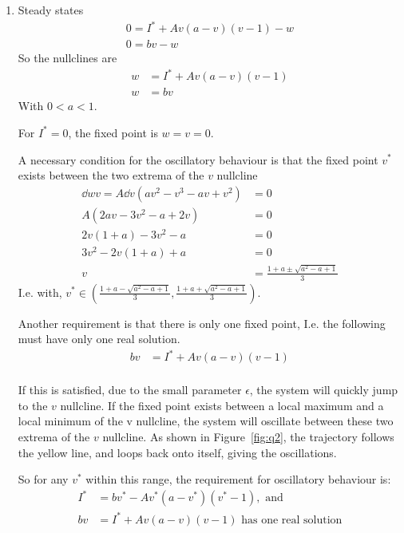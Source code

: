 \documentclass{X:/Documents/Coding/Latex/myassignment}
\begin{document}
\begin{enumerate}
\begin{enumerate}
	\end{enumerate}
	\item
	Steady states
	\begin{align*}
		0 =I^* + A v (a- v)(v -1) - w\\
		0 = bv - w
	\end{align*}
	So the nullclines are 
	\begin{align*}
		w &= I^* + A v (a- v)(v -1)\\
		w &= b v
	\end{align*}
	With $0<a<1$.

	For $I^* = 0$, the fixed point is $w = v = 0$.

	A necessary condition for the oscillatory behaviour is that the fixed point $v^*$ exists between the two extrema of the $v$ nullcline
	\begin{align*}
		\dd wv = A\dd{}v\left(av^2 - v^3 -av + v^2\right) &=0\\
		A\left(2av - 3v^2 - a + 2v\right) &=0\\
		2v(1+a) - 3v^2 - a &=0\\
		3v^2 -2v(1+a) + a &= 0\\
		v &= \frac{1+a \pm \sqrt{a^2 - a+1}}{3}
	\end{align*}
	I.e. with, $v^* \in \left(\frac{1+a - \sqrt{a^2 - a+1}}{3}, \frac{1+a  + \sqrt{a^2 - a+1}}{3}\right)$.

	Another requirement is that there is only one fixed point, 
	I.e. the following must have only one real solution.
	\begin{align*}
		b v &= I^* + A v (a- v)(v -1)\\
	\end{align*}

	If this is satisfied, due to the small parameter $\epsilon$, the system will quickly jump to the $v$ nullcline. If the fixed point exists between a local maximum and a local minimum of the v nullcline,  the system will oscillate between these two extrema of the $v$ nullcline. As shown in Figure~\ref{fig:q2}, the trajectory follows the yellow line, and loops back onto itself, giving the oscillations.
	


	So for any $v^*$ within this range, the requirement for oscillatory behaviour is:
	\begin{align*}
		I^* &= bv^* - A v^* (a- v^*)(v^* -1), \text{ and}\\
		b v &= I^* + A v (a- v)(v -1) \text{ has one real solution}\\
	\end{align*}


\end{enumerate}
\end{document}
